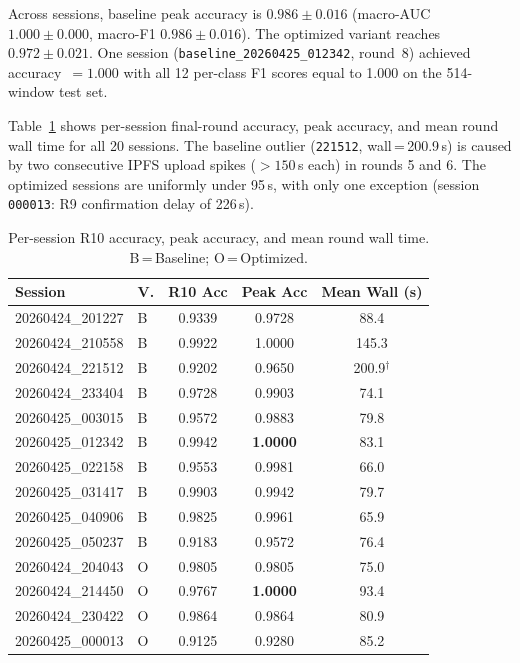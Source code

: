 \documentclass{llncs}
\begin{document}
Across sessions, baseline peak accuracy is $0.986\pm0.016$ (macro-AUC
$1.000\pm0.000$, macro-F1 $0.986\pm0.016$). The optimized variant
reaches $0.972\pm0.021$. One session (\texttt{baseline\_20260425\_012342},
round~8) achieved accuracy~$=1.000$ with all 12 per-class F1 scores equal
to 1.000 on the 514-window test set.

Table~\ref{tab:sessions} shows per-session final-round accuracy, peak
accuracy, and mean round wall time for all 20 sessions. The baseline
outlier (\texttt{221512}, wall\,=\,200.9\,s) is caused by two consecutive
IPFS upload spikes ($>150$\,s each) in rounds 5 and 6. The optimized
sessions are uniformly under 95\,s, with only one exception (session
\texttt{000013}: R9 confirmation delay of 226\,s).

\begin{table}[t]
\caption{Per-session R10 accuracy, peak accuracy, and mean round wall
  time. B\,=\,Baseline; O\,=\,Optimized.}
\label{tab:sessions}
\centering\footnotesize
\setlength{\tabcolsep}{4pt}
\begin{tabular}{llccc}
\toprule
\textbf{Session} & \textbf{V.} & \textbf{R10 Acc} & \textbf{Peak Acc} & \textbf{Mean Wall (s)} \\
\midrule
20260424\_201227 & B & 0.9339 & 0.9728 & \phantom{0}88.4 \\
20260424\_210558 & B & 0.9922 & 1.0000 & 145.3 \\
20260424\_221512 & B & 0.9202 & 0.9650 & 200.9$^{\dagger}$ \\
20260424\_233404 & B & 0.9728 & 0.9903 & \phantom{0}74.1 \\
20260425\_003015 & B & 0.9572 & 0.9883 & \phantom{0}79.8 \\
20260425\_012342 & B & 0.9942 & \textbf{1.0000} & \phantom{0}83.1 \\
20260425\_022158 & B & 0.9553 & 0.9981 & \phantom{0}66.0 \\
20260425\_031417 & B & 0.9903 & 0.9942 & \phantom{0}79.7 \\
20260425\_040906 & B & 0.9825 & 0.9961 & \phantom{0}65.9 \\
20260425\_050237 & B & 0.9183 & 0.9572 & \phantom{0}76.4 \\
\midrule
20260424\_204043 & O & 0.9805 & 0.9805 & \phantom{0}75.0 \\
20260424\_214450 & O & 0.9767 & \textbf{1.0000} & \phantom{0}93.4 \\
20260424\_230422 & O & 0.9864 & 0.9864 & \phantom{0}80.9 \\
20260425\_000013 & O & 0.9125 & 0.9280 & \phantom{0}85.2 \\

\end{tabular}
\end{table}
\end{document}
